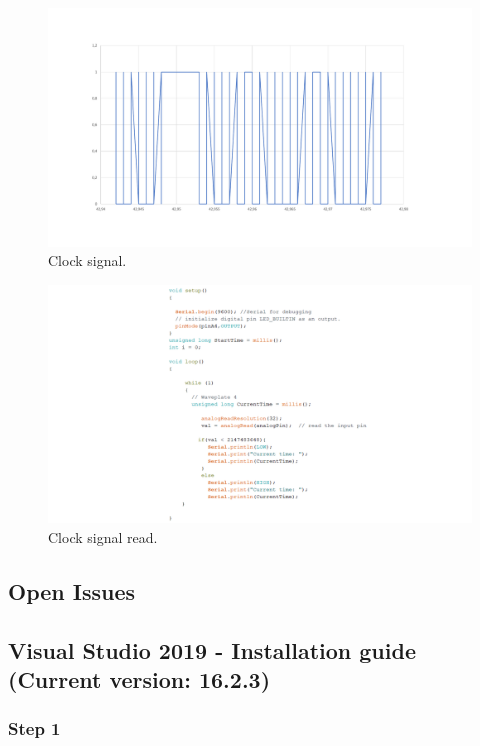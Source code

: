 \begin{refsection}
	\begin{figure}[H]
		\centering
		\includegraphics[width=1.1\linewidth]{./sdf/arduino_quantum_rx/figures/Clockard.pdf}
		\caption{Clock signal.}
		\label{fig:netxpto}
	\end{figure}
	
	\begin{figure}[H]
		\centering
		\includegraphics[width=1.1\linewidth]{./sdf/arduino_quantum_rx/figures/clockRead.pdf}
		\caption{Clock signal read.}
		\label{montage}
	\end{figure}
	
	
	\subsection{Open Issues}
	
	\clearpage
	\subsection{Visual Studio 2019 - Installation guide (Current version: 16.2.3)}
	
	\subsubsection{Step 1}
	

\end{refsection}
